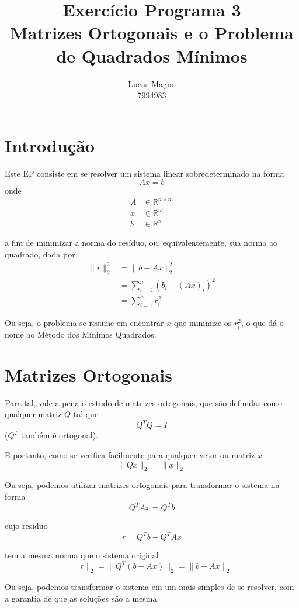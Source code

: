 \documentclass[a4paper,11pt]{article}
\date{}
\author{Lucas Magno \\ 7994983}
\title{Exercício Programa 3 \\ Matrizes Ortogonais e o Problema de Quadrados Mínimos}
\begin{document}
    \maketitle

    \section*{Introdução}
        Este EP consiste em se resolver um sistema linear sobredeterminado na forma
        $$ Ax = b $$
        onde
        \begin{align*}
            A & \in \mathbb{R}^{n\times m}\\
            x & \in \mathbb{R}^{m} \\
            b & \in \mathbb{R}^{n}
        \end{align*}

        a fim de minimizar a norma do resíduo, ou, equivalentemente, sua norma ao quadrado, dada por
        \begin{align*}
            \| r \|_2^2 &= \| b - Ax \|_2^2 \\
                                 &= \sum_{i = 1}^n (b_i - (Ax)_i)^2 \\
                                 &= \sum_{i = 1}^n r_i^2
        \end{align*}

        Ou seja, o problema se resume em encontrar $x$ que minimize os $r_i^2$, o que dá o nome ao Método dos Mínimos Quadrados.

    \section*{Matrizes Ortogonais}
        Para tal, vale a pena o estudo de matrizes ortogonais, que são definidas como qualquer matriz $Q$ tal que
        $$ Q^TQ = I$$
        ($Q^T$ também é ortogonal).

        E portanto, como se verifica facilmente para qualquer vetor ou matriz $x$
        $$ \| Qx \|_2 = \| x \|_2$$

        Ou seja, podemos utilizar matrizes ortogonais para transformar o sistema na forma
        $$ Q^TAx = Q^Tb$$

        cujo resíduo
        $$ r = Q^Tb - Q^TAx$$

        tem a mesma norma que o sistema original
        $$ \|r\|_2 = \|Q^T(b - Ax)\|_2 = \|b - Ax\|_2$$

        Ou seja, podemos transformar o sistema em um mais simples de se resolver, com a garantia de que as soluções são a mesma.
    \newpage
\end{document}
